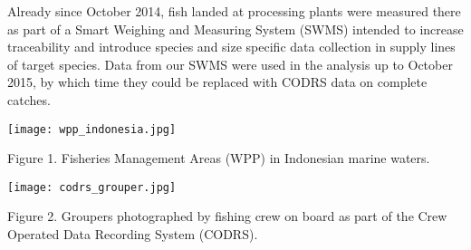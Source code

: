 Already since October 2014, fish landed at processing plants were measured there as part of a Smart Weighing and Measuring System (SWMS) intended to increase traceability and introduce species and size specific data collection in supply lines of target species. Data from our SWMS were used in the analysis up to October 2015, by which time they could be replaced with CODRS data on complete catches.

\begin{center}
\graphicspath{{/root/R-project/IFishGrouper/Images/}}
\texttt{[image: wpp\_indonesia.jpg]}

Figure 1. Fisheries Management Areas (WPP) in Indonesian marine waters.
\end{center}

\begin{center}
\graphicspath{{/root/R-project/IFishGrouper/Images/}}
\texttt{[image: codrs\_grouper.jpg]}

Figure 2. Groupers photographed by fishing crew on board as part of the Crew Operated Data Recording System (CODRS).
\end{center}